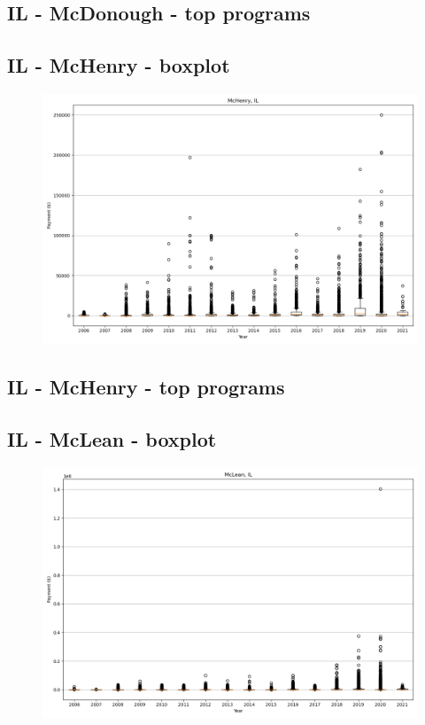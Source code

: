 \subsection*{IL - McDonough - top programs}

\newpage
\subsection*{IL - McHenry - boxplot}
\begin{figure}[h]
\centering
\includegraphics[width=7in]{../output/boxplots/counties/McHenry-IL_boxplot.png}
\end{figure}


\subsection*{IL - McHenry - top programs}

\newpage
\subsection*{IL - McLean - boxplot}
\begin{figure}[h]
\centering
\includegraphics[width=7in]{../output/boxplots/counties/McLean-IL_boxplot.png}
\end{figure}


